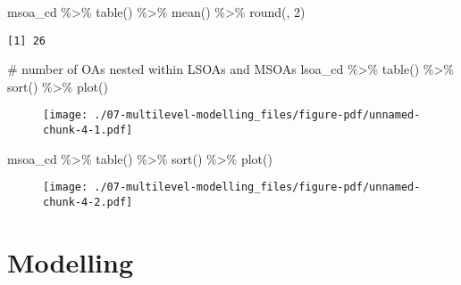 \documentclass[
  letterpaper,
  krantz2]{style/krantz}
\newenvironment{Shaded}{\begin{snugshade}}{\end{snugshade}}
\newcommand{\CommentTok}[1]{\textcolor[rgb]{0.37,0.37,0.37}{#1}}
\newcommand{\DecValTok}[1]{\textcolor[rgb]{0.68,0.00,0.00}{#1}}
\newcommand{\FunctionTok}[1]{\textcolor[rgb]{0.28,0.35,0.67}{#1}}
\newcommand{\NormalTok}[1]{\textcolor[rgb]{0.00,0.23,0.31}{#1}}
\newcommand{\SpecialCharTok}[1]{\textcolor[rgb]{0.37,0.37,0.37}{#1}}
\begin{document}
\begin{Shaded}
\begin{Highlighting}[]
\NormalTok{msoa\_cd }\SpecialCharTok{\%\textgreater{}\%} \FunctionTok{table}\NormalTok{() }\SpecialCharTok{\%\textgreater{}\%}
  \FunctionTok{mean}\NormalTok{() }\SpecialCharTok{\%\textgreater{}\%}
  \FunctionTok{round}\NormalTok{(, }\DecValTok{2}\NormalTok{)}
\end{Highlighting}
\end{Shaded}

\begin{verbatim}
[1] 26
\end{verbatim}

\begin{Shaded}
\begin{Highlighting}[]
\CommentTok{\# number of OAs nested within LSOAs and MSOAs}
\NormalTok{lsoa\_cd }\SpecialCharTok{\%\textgreater{}\%} \FunctionTok{table}\NormalTok{() }\SpecialCharTok{\%\textgreater{}\%}
  \FunctionTok{sort}\NormalTok{() }\SpecialCharTok{\%\textgreater{}\%}
  \FunctionTok{plot}\NormalTok{()}
\end{Highlighting}
\end{Shaded}

\begin{figure}[H]

{\centering \texttt{[image: ./07-multilevel-modelling\_files/figure-pdf/unnamed-chunk-4-1.pdf]}

}

\end{figure}

\begin{Shaded}
\begin{Highlighting}[]
\NormalTok{msoa\_cd }\SpecialCharTok{\%\textgreater{}\%} \FunctionTok{table}\NormalTok{() }\SpecialCharTok{\%\textgreater{}\%}
  \FunctionTok{sort}\NormalTok{() }\SpecialCharTok{\%\textgreater{}\%}
  \FunctionTok{plot}\NormalTok{()}
\end{Highlighting}
\end{Shaded}

\begin{figure}[H]

{\centering \texttt{[image: ./07-multilevel-modelling\_files/figure-pdf/unnamed-chunk-4-2.pdf]}

}

\end{figure}

\hypertarget{modelling}{%
\section{Modelling}\label{modelling}}
\end{document}

